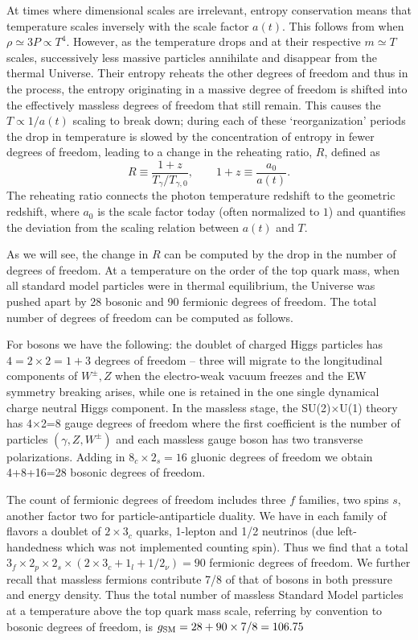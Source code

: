 At times where dimensional scales are irrelevant, entropy conservation means that temperature scales inversely with the scale factor $a(t)$. This follows from  when $ \rho\simeq 3P \propto T^4$. However, as the temperature drops and at their respective $m\simeq T$ scales, successively less massive particles annihilate and disappear from the thermal Universe. Their entropy reheats the other degrees of freedom and thus in the process, the entropy originating in a massive degree of freedom is shifted into the effectively massless degrees of freedom that still remain. This causes the $T\propto 1/a(t)$ scaling to break down; during each of these `reorganization' periods the drop in temperature is slowed by the concentration of entropy in fewer degrees of freedom, leading to a change in the reheating ratio, $R$, defined as
\begin{equation}\label{redshiftratio}
R\equiv \frac{1+z}{ T_\gamma/T_{\gamma,0}}, \qquad 1+z\equiv \frac{a_{0}}{a(t)}.
\end{equation}
The reheating ratio connects the photon temperature redshift to the geometric redshift, where $a_0$ is the scale factor today (often normalized to $1$) and quantifies the deviation from the scaling relation between $a(t)$ and $T$.

As we will see, the change in $R$ can be computed by the drop in the number of degrees of freedom. At a temperature on the order of the top quark mass, when all standard model particles were in thermal equilibrium, the Universe was pushed apart by 28 bosonic and 90 fermionic degrees of freedom. The total number of degrees of freedom can be computed as follows. 

For bosons we have the following: the doublet of charged Higgs particles has $4=2\times2=1+3$ degrees of freedom -- three will migrate to the longitudinal components of $W^\pm, Z$ when the electro-weak vacuum freezes and the EW symmetry breaking arises, while one is retained in the one single dynamical charge neutral Higgs component. In the massless stage, the SU(2)$\times$U(1) theory has 4$\times$2=8 gauge degrees of freedom where the first coefficient is the number of particles $(\gamma, Z, W^\pm)$ and each massless gauge boson has two transverse polarizations. Adding in $8_c\times2_s=16$ gluonic degrees of freedom we obtain 4+8+16=28 bosonic degrees of freedom. 

The count of fermionic degrees of freedom includes three $f$ families, two spins $s$, another factor two for particle-antiparticle duality. We have in each family of flavors a doublet of $2\times 3_c$ quarks, 1-lepton and 1/2 neutrinos (due left-handedness which was not implemented counting spin). Thus we find that a total $3_f\times 2_p\times 2_s\times(2\times 3_c+1_l+1/2_\nu)=90$ fermionic degrees of freedom. We further recall that massless fermions contribute 7/8 of that of bosons in both pressure and energy density. Thus the total number of massless Standard Model particles at a temperature above the top quark mass scale, referring by convention to bosonic degrees of freedom, is $g_{\rm SM}=28+90\times 7/8=106.75$ 




